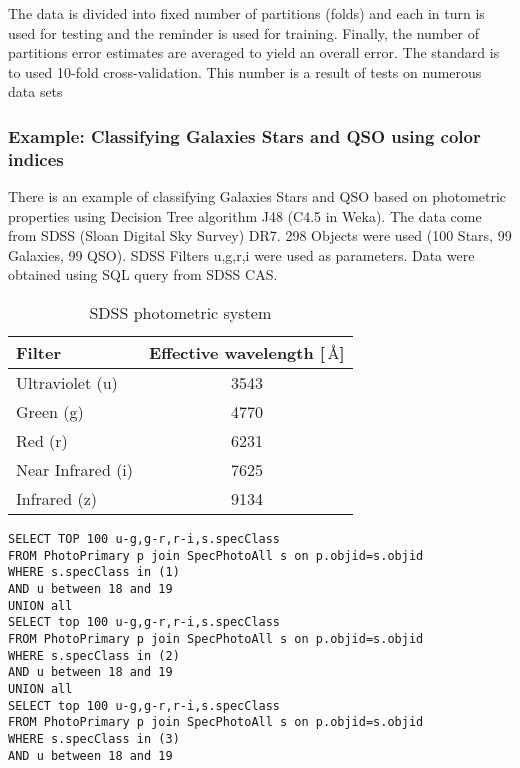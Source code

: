The data is divided into fixed number of partitions (folds) and each
in turn is used for testing and the reminder is used for
training. Finally, the number of partitions error estimates are
averaged to yield an overall error. The standard is to used 10-fold
cross-validation. This number is a result of tests on numerous data
sets \citep{witten2005data}

\subsubsection{Example: Classifying Galaxies Stars and QSO using color
indices}



  There is an example of classifying Galaxies Stars
and QSO based on photometric properties using Decision Tree algorithm
J48 (C4.5 in Weka). The data come from SDSS (Sloan Digital Sky Survey)
DR7. 298 Objects were used (100 Stars, 99 Galaxies, 99 QSO). SDSS
Filters u,g,r,i were used as parameters. Data were obtained using SQL
query from SDSS CAS.

\begin{table}[ht]
  \centering
  \small
     \begin{tabular}[ht]{l c}
     \toprule
     Filter & Effective wavelength [$\,\textrm{\AA}$] \\
     \midrule
     Ultraviolet (u) & 3543 \\
     Green (g) & 4770\\
     Red (r) & 6231\\
     Near Infrared (i) & 7625\\
     Infrared (z) & 9134 \\
     \bottomrule
   \end{tabular}
  \caption{SDSS photometric system}
  \label{tab:SDSSFilter}
\end{table}



\begin{lstlisting}
SELECT TOP 100 u-g,g-r,r-i,s.specClass
FROM PhotoPrimary p join SpecPhotoAll s on p.objid=s.objid 
WHERE s.specClass in (1)
AND u between 18 and 19
UNION all
SELECT top 100 u-g,g-r,r-i,s.specClass
FROM PhotoPrimary p join SpecPhotoAll s on p.objid=s.objid 
WHERE s.specClass in (2)
AND u between 18 and 19
UNION all
SELECT top 100 u-g,g-r,r-i,s.specClass
FROM PhotoPrimary p join SpecPhotoAll s on p.objid=s.objid 
WHERE s.specClass in (3)
AND u between 18 and 19
\end{lstlisting}

